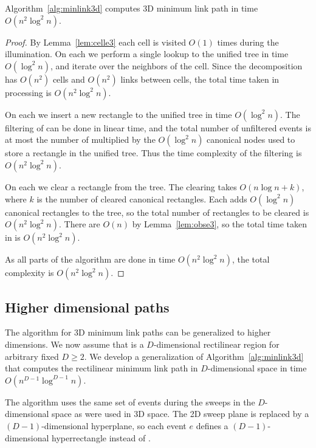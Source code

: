 \documentclass[english,gradu]{tktltiki2018}
\begin{document}
\begin{theo}Algorithm~\ref{alg:minlink3d} computes 3D minimum link path in time $O(n^2\log^2n)$.\end{theo}
\begin{proof}
By Lemma~\ref{lem:celle3} each cell is visited $O(1)$ times during the illumination.
On each \cellE we perform a single lookup to the unified tree in time $O(\log^2 n)$, and iterate over the neighbors of the cell.
Since the decomposition has $O(n^2)$ cells and $O(n^2)$ links between cells, the total time taken in processing \cellEs is $O(n^2\log^2 n)$.

On each \addE we insert a new rectangle to the unified tree in time $O(\log^2 n)$.
The filtering of \addEs can be done in linear time, and the total number of unfiltered events is at most the number of \addEs multiplied by the $O(\log^2 n)$ canonical nodes used to store a rectangle in the unified tree.
Thus the time complexity of the filtering is $O(n^2\log^2 n)$.

On each \obsE we clear a rectangle from the tree.
The clearing takes $O(n\log n + k)$, where $k$ is the number of cleared canonical rectangles.
Each \addE adds $O(\log^2 n)$ canonical rectangles to the tree, so the total number of rectangles to be cleared is $O(n^2\log^2 n)$.
There are $O(n)$ \obsEs by Lemma~\ref{lem:obse3}, so the total time taken in \obsEs is $O(n^2\log^2 n)$.

As all parts of the algorithm are done in time $O(n^2\log^2 n)$, the total complexity is $O(n^2\log^2 n)$.
\end{proof}

\subsection{Higher dimensional paths}

The algorithm for 3D minimum link paths can be generalized to higher dimensions.
We now assume that \fspace is a $D$-dimensional rectilinear region for arbitrary fixed $D\ge 2$.
We develop a generalization of Algorithm~\ref{alg:minlink3d} that computes the rectilinear minimum link path in $D$-dimensional space in time $O(n^{D-1}\log^{D-1}n)$.

The algorithm uses the same set of events during the sweeps in the $D$-dimensional space as were used in 3D space.
The 2D sweep plane is replaced by a $(D-1)$-dimensional hyperplane, so each event $e$ defines a $(D-1)$-dimensional hyperrectangle  instead of .
\end{document}
